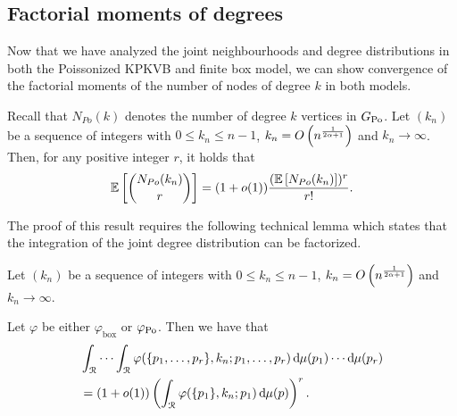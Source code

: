 \subsection{Factorial moments of degrees}\label{ssec:factorial_moments_GPo}

Now that we have analyzed the joint neighbourhoods and degree distributions in both the Poissonized KPKVB and finite box model, we can show convergence of the factorial moments of the number of nodes of degree $k$ in both models.

\begin{lemma}\label{lem:factmoment}
Recall that $N_{Po}(k)$ denotes the number of degree $k$ vertices in $G_{{\mathrm{Po}}}$. Let $(k_n)$ be a sequence of integers with $0\leq k_n \leq n-1$, $k_n = O\left(n^{\frac{1}{2\alpha+1}}\right)$ and $k_n \rightarrow \infty$. Then, for any positive integer $r$, it holds that
\[
	\mathbb{E}\left[{N_{Po}(k_n) \choose r}\right] =(1+o(1)) \frac{(\mathbb{E}\left[ N_{Po}(k_n)\right])^r}{r!}.
\]
\end{lemma}

The proof of this result requires the following technical lemma which states that the integration of the joint degree distribution can be factorized.

\begin{lemma}
	\label{lem:asympind}
	Let $(k_n)$ be a sequence of integers with $0\leq k_n \leq n-1$, $k_n = O\left(n^{\frac{1}{2\alpha+1}}\right)$ and $k_n \rightarrow \infty$.
	
	Let $\varphi$ be either $\varphi_{\mathrm{box}}$ or $\varphi_{{\mathrm{Po}}}$. Then we have that
	\begin{align*}
	&\int_{{\mathcal R}} \cdots \int_{{\mathcal R}} \varphi(\{p_1,\dots,p_r \}, k_n ;p_1,\dots,p_r) 
		 \operatorname{\mathrm{d}\hspace{-2pt}} \mu(p_1) \cdots \operatorname{\mathrm{d}\hspace{-2pt}} \mu(p_r) \\
	&= (1+o(1))\left(\int_{{\mathcal R}}  \varphi(\{p_1\}, k_n ;p_1) \operatorname{\mathrm{d}\hspace{-2pt}} \mu(p)\right)^r .
	\end{align*}
\end{lemma}

